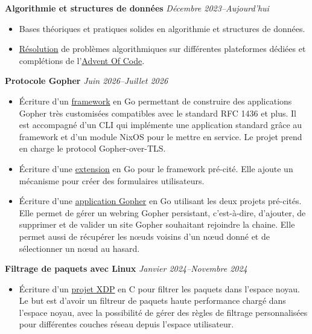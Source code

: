 \documentclass[margin,line]{../res}
\begin{document}
\begin{resume}
  {\bf Algorithmie et structures de données}
  \hfill {\it Décembre 2023--Aujourd'hui}
  \vspace*{.05in}
  \begin{itemize}
    \item Bases théoriques et pratiques solides en algorithmie et
      structures de données.
    \item \href{https://leetcode.com/u/theobori/}{Résolution} de
      problèmes algorithmiques sur différentes plateformes dédiées et
      complétions de
      l'\href{https://github.com/theobori/advent-of-code}{Advent Of Code}.
  \end{itemize}

  {\bf Protocole Gopher}
  \hfill {\it Juin 2026--Juillet 2026}
  \vspace*{.05in}
  \begin{itemize}
    \item \'Ecriture d'un
      \href{https://github.com/theobori/fleur}{framework} en Go
      permettant de construire des applications Gopher très
      customisées compatibles avec le standard RFC 1436 et plus. Il
      est accompagné d'un CLI qui implémente une application standard
      grâce au framework et d'un module NixOS pour le mettre en
      service. Le projet prend en charge le protocol Gopher-over-TLS.
    \item \'Ecriture d'une
      \href{https://github.com/theobori/fleur-form}{extension} en Go
      pour le framework pré-cité. Elle ajoute un mécanisme pour créer
      des formulaires utilisateurs.
    \item \'Ecriture d'une
      \href{https://github.com/theobori/ange}{application Gopher} en
      Go utilisant les deux projets pré-cités. Elle permet de gérer
      un webring Gopher persistant, c'est-à-dire, d'ajouter, de
      supprimer et de valider un site Gopher souhaitant rejoindre la
      chaine. Elle permet aussi de récupérer les nœuds voisins d'un
      nœud donné et de sélectionner un nœud au hasard.
  \end{itemize}

  {\bf Filtrage de paquets avec Linux}
  \hfill {\it Janvier 2024--Novembre 2024}
  \vspace*{.05in}
  \begin{itemize}
    \item \'Ecriture d'un
      \href{https://github.com/theobori/tinyfilter}{projet XDP} en C pour
      filtrer les paquets dans l'espace noyau. Le but est d'avoir un
      filtreur de paquets haute performance
      chargé dans l'espace noyau, avec la possibilité de gérer des
      règles de filtrage personnalisées pour différentes couches
      réseau depuis l'espace utilisateur.
  \end{itemize}


\end{resume}
\end{document}
